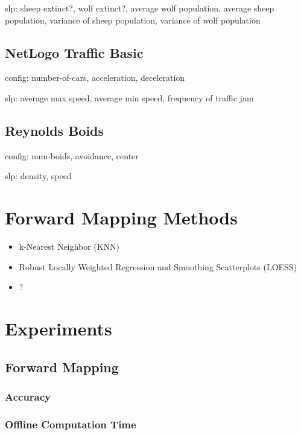 slp: sheep extinct?, wolf extinct?, average wolf population, average sheep population, variance of sheep population, variance of wolf population

 \subsection{NetLogo Traffic Basic}

config: number-of-cars, acceleration, deceleration

slp: average max speed, average min speed, frequency of traffic jam

 \subsection{Reynolds Boids}

config: num-boids, avoidance, center

slp: density, speed


\section{Forward Mapping Methods}\label{sec:fmalgo}

\begin{itemize}
 \item k-Nearest Neighbor (KNN)
 \item Robust Locally Weighted Regression and Smoothing Scatterplots (LOESS)
 \item ?
\end{itemize}



\section{Experiments}\label{sec:exps}

 \subsection{Forward Mapping}

  \subsubsection{Accuracy}

  \subsubsection{Offline Computation Time}

